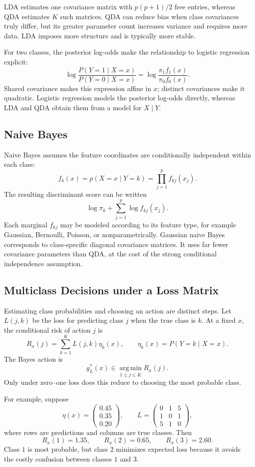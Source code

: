 \documentclass[12pt,oneside]{book}
\numberwithin{equation}{section}
\theoremstyle{definition}
\theoremstyle{plain}
\theoremstyle{remark}
\newcommand{\argmin}{\operatorname*{arg\,min}}
\begin{document}
LDA estimates one covariance matrix with $p(p+1)/2$ free entries, whereas QDA
estimates $K$ such matrices. QDA can reduce bias when class covariances truly
differ, but its greater parameter count increases variance and requires more
data. LDA imposes more structure and is typically more stable.

For two classes, the posterior log-odds make the relationship to logistic
regression explicit:
\[
 \log\frac{P(Y=1\mid X=x)}{P(Y=0\mid X=x)}
 =\log\frac{\pi_1f_1(x)}{\pi_0f_0(x)}.
\]
Shared covariance makes this expression affine in $x$; distinct covariances
make it quadratic. Logistic regression models the posterior log-odds directly,
whereas LDA and QDA obtain them from a model for $X\mid Y$.

\subsection{Naive Bayes}
Naive Bayes assumes the feature coordinates are conditionally independent
within each class:
\[
 f_k(x)=p(X=x\mid Y=k)
 =\prod_{j=1}^p f_{kj}(x_j).
\]
The resulting discriminant score can be written
\[
 \log\pi_k+\sum_{j=1}^p\log f_{kj}(x_j).
\]
Each marginal $f_{kj}$ may be modeled according to its feature type, for
example Gaussian, Bernoulli, Poisson, or nonparametrically. Gaussian naive
Bayes corresponds to class-specific diagonal covariance matrices. It uses far
fewer covariance parameters than QDA, at the cost of the strong conditional
independence assumption.

\subsection{Multiclass Decisions under a Loss Matrix}
Estimating class probabilities and choosing an action are distinct steps. Let
$L(j,k)$ be the loss for predicting class $j$ when the true class is $k$.
At a fixed $x$, the conditional risk of action $j$ is
\[
 R_x(j)=\sum_{k=1}^K L(j,k)\eta_k(x),
 \qquad \eta_k(x)=P(Y=k\mid X=x).
\]
The Bayes action is
\begin{equation}
 g_L^*(x)\in\argmin_{1\leq j\leq K}R_x(j).
 \label{eq:multiclass-loss-rule}
\end{equation}
Only under zero--one loss does this reduce to choosing the most probable class.

For example, suppose
\[
 \eta(x)=\begin{pmatrix}0.45\\0.35\\0.20\end{pmatrix},
 \qquad
 L=\begin{pmatrix}0&1&5\\1&0&1\\5&1&0\end{pmatrix},
\]
where rows are predictions and columns are true classes. Then
\[
 R_x(1)=1.35,\qquad R_x(2)=0.65,\qquad R_x(3)=2.60.
\]
Class $1$ is most probable, but class $2$ minimizes expected loss because it
avoids the costly confusion between classes $1$ and $3$.
\end{document}
